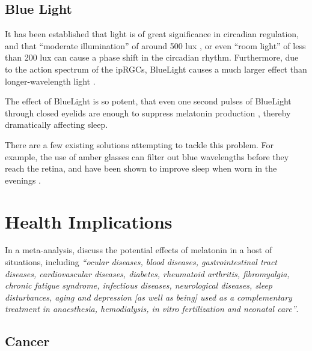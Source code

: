 \subsection{Blue Light}

It has been established that light is of great significance in circadian regulation, and that ``moderate illumination'' of around 500 lux \citep{laaksoOnehourExposureModerate1993}, or even ``room light'' of less than 200 lux \citep{gooleyExposureRoomLight2011} can cause a phase shift in the circadian rhythm. Furthermore, due to the action spectrum of the ipRGCs, \gls{BlueLight} causes a much larger effect than longer-wavelength light \citep{lockleyHighSensitivityHuman2003}.

The effect of \gls{BlueLight} is so potent, that even one second pulses of \gls{BlueLight} through closed eyelids are enough to suppress melatonin production \citep{figueiroTrainBlueLight2013}, thereby dramatically affecting sleep. 

There are a few existing solutions attempting to tackle this problem. For example, the use of amber glasses can filter out blue wavelengths before they reach the retina, and have been shown to improve sleep when worn in the evenings \citep{kimberlyAmberLensesBlock2009}.






\section{Health Implications}
\label{Sec:Health}


In a meta-analysis, \citet{sanchez-barceloClinicalUsesMelatonin2010} discuss the potential effects of melatonin in a host of situations, including \textit{``ocular diseases, blood diseases, gastrointestinal tract diseases, cardiovascular diseases, diabetes, rheumatoid arthritis, fibromyalgia, chronic fatigue syndrome, infectious diseases, neurological diseases, sleep disturbances, aging and depression [as well as being] used as a complementary treatment in anaesthesia, hemodialysis, in vitro fertilization and neonatal care''}.

\subsection{Cancer}


